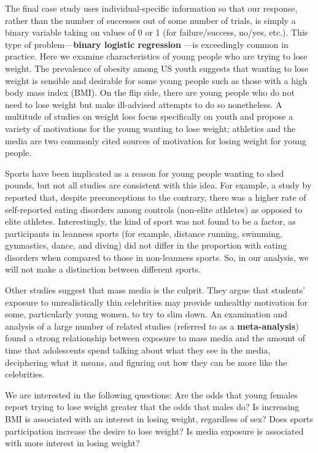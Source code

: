\documentclass[
]{krantz}
\begin{document}
The final case study uses individual-specific information so that our response, rather than the number of successes out of some number of trials, is simply a binary variable taking on values of 0 or 1 (for failure/success, no/yes, etc.). This type of problem---\textbf{binary logistic regression} ---is exceedingly common in practice. Here we examine characteristics of young people who are trying to lose weight. The prevalence of obesity among US youth suggests that wanting to lose weight is sensible and desirable for some young people such as those with a high body mass index (BMI). On the flip side, there are young people who do not need to lose weight but make ill-advised attempts to do so nonetheless. A multitude of studies on weight loss focus specifically on youth and propose a variety of motivations for the young wanting to lose weight; athletics and the media are two commonly cited sources of motivation for losing weight for young people.

Sports have been implicated as a reason for young people wanting to shed pounds, but not all studies are consistent with this idea. For example, a study by \citet{Martinsen2009} reported that, despite preconceptions to the contrary, there was a higher rate of self-reported eating disorders among controls (non-elite athletes) as opposed to elite athletes. Interestingly, the kind of sport was not found to be a factor, as participants in leanness sports (for example, distance running, swimming, gymnastics, dance, and diving) did not differ in the proportion with eating disorders when compared to those in non-leanness sports. So, in our analysis, we will not make a distinction between different sports.

Other studies suggest that mass media is the culprit. They argue that students' exposure to unrealistically thin celebrities may provide unhealthy motivation for some, particularly young women, to try to slim down. An examination and analysis of a large number of related studies (referred to as a \textbf{meta-analysis}) \citep{Grabe2008} found a strong relationship between exposure to mass media and the amount of time that adolescents spend talking about what they see in the media, deciphering what it means, and figuring out how they can be more like the celebrities.

We are interested in the following questions: Are the odds that young females report trying to lose weight greater that the odds that males do? Is increasing BMI is associated with an interest in losing weight, regardless of sex? Does sports participation increase the desire to lose weight? Is media exposure is associated with more interest in losing weight?
\end{document}
